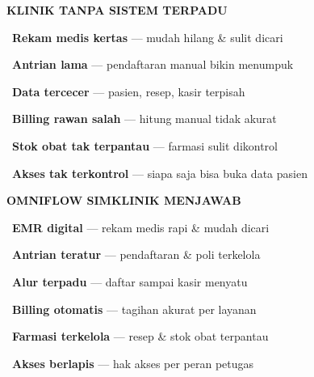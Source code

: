 \documentclass[a4paper]{article}
\begin{document}
\noindent
\begin{minipage}[t]{0.485\textwidth}
    \colorbox{RedLight}{%
        \begin{minipage}{\dimexpr\textwidth-2\fboxsep\relax}
            {\fontsize{10}{13}\selectfont\bfseries\color{RedText} KLINIK TANPA SISTEM TERPADU}
        \end{minipage}}\par
    \vspace{4pt}

    {\fontsize{9.5}{13}\selectfont\color{TextDark}%
    \textbullet\ \textbf{Rekam medis kertas} --- mudah hilang \& sulit dicari\par\vspace{4pt}%
    \textbullet\ \textbf{Antrian lama} --- pendaftaran manual bikin menumpuk\par\vspace{4pt}%
    \textbullet\ \textbf{Data tercecer} --- pasien, resep, kasir terpisah\par\vspace{4pt}%
    \textbullet\ \textbf{Billing rawan salah} --- hitung manual tidak akurat\par\vspace{4pt}%
    \textbullet\ \textbf{Stok obat tak terpantau} --- farmasi sulit dikontrol\par\vspace{4pt}%
    \textbullet\ \textbf{Akses tak terkontrol} --- siapa saja bisa buka data pasien}%
\end{minipage}%
\hfill%
\begin{minipage}[t]{0.485\textwidth}
    \colorbox{BluePrimary}{%
        \begin{minipage}{\dimexpr\textwidth-2\fboxsep\relax}
            {\fontsize{10}{13}\selectfont\bfseries\color{White} OMNIFLOW SIMKLINIK MENJAWAB}
        \end{minipage}}\par
    \vspace{4pt}

    {\fontsize{9.5}{13}\selectfont\color{TextDark}%
    \textbullet\ \textbf{EMR digital} --- rekam medis rapi \& mudah dicari\par\vspace{4pt}%
    \textbullet\ \textbf{Antrian teratur} --- pendaftaran \& poli terkelola\par\vspace{4pt}%
    \textbullet\ \textbf{Alur terpadu} --- daftar sampai kasir menyatu\par\vspace{4pt}%
    \textbullet\ \textbf{Billing otomatis} --- tagihan akurat per layanan\par\vspace{4pt}%
    \textbullet\ \textbf{Farmasi terkelola} --- resep \& stok obat terpantau\par\vspace{4pt}%
    \textbullet\ \textbf{Akses berlapis} --- hak akses per peran petugas}%
\end{minipage}
\end{document}
